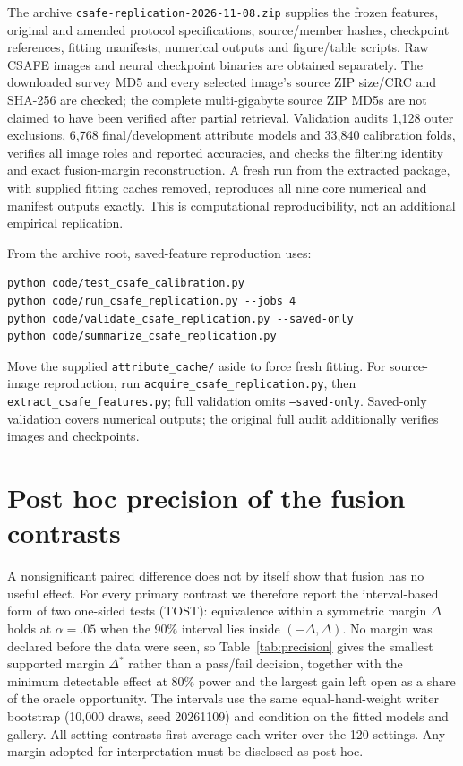\documentclass[10pt,a4paper]{article}
\begin{document}
The archive \texttt{csafe-replication-2026-11-08.zip} supplies the frozen features, original and amended protocol specifications, source/member hashes, checkpoint references, fitting manifests, numerical outputs and figure/table scripts. Raw CSAFE images and neural checkpoint binaries are obtained separately. The downloaded survey MD5 and every selected image's source ZIP size/CRC and SHA-256 are checked; the complete multi-gigabyte source ZIP MD5s are not claimed to have been verified after partial retrieval. Validation audits 1,128 outer exclusions, 6,768 final/development attribute models and 33,840 calibration folds, verifies all image roles and reported accuracies, and checks the filtering identity and exact fusion-margin reconstruction. A fresh run from the extracted package, with supplied fitting caches removed, reproduces all nine core numerical and manifest outputs exactly. This is computational reproducibility, not an additional empirical replication.

From the archive root, saved-feature reproduction uses:
\begin{verbatim}
python code/test_csafe_calibration.py
python code/run_csafe_replication.py --jobs 4
python code/validate_csafe_replication.py --saved-only
python code/summarize_csafe_replication.py
\end{verbatim}
Move the supplied \texttt{attribute\_cache/} aside to force fresh fitting. For source-image reproduction, run \texttt{acquire\_csafe\_replication.py}, then \texttt{extract\_csafe\_features.py}; full validation omits \texttt{--saved-only}. Saved-only validation covers numerical outputs; the original full audit additionally verifies images and checkpoints.

\section{Post hoc precision of the fusion contrasts}
\label{sec:supprecision}
A nonsignificant paired difference does not by itself show that fusion has no useful effect. For every primary contrast we therefore report the interval-based form of two one-sided tests (TOST): equivalence within a symmetric margin $\Delta$ holds at $\alpha=.05$ when the 90\% interval lies inside $(-\Delta,\Delta)$. No margin was declared before the data were seen, so Table~\ref{tab:precision} gives the smallest supported margin $\Delta^*$ rather than a pass/fail decision, together with the minimum detectable effect at 80\% power and the largest gain left open as a share of the oracle opportunity. The intervals use the same equal-hand-weight writer bootstrap (10,000 draws, seed 20261109) and condition on the fitted models and gallery. All-setting contrasts first average each writer over the 120 settings. Any margin adopted for interpretation must be disclosed as post hoc.
\end{document}
